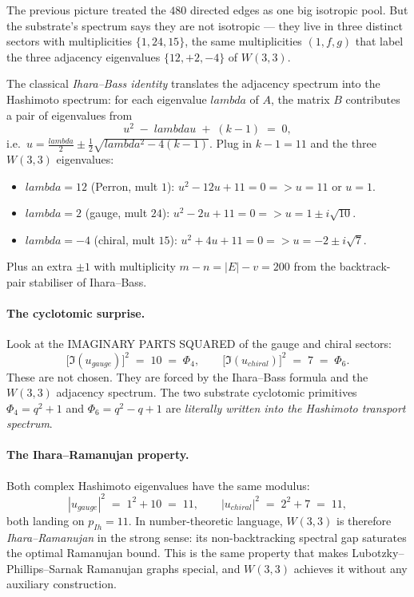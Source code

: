 \documentclass[11pt]{article}
\def\mathrm#1{#1}%
\def\text#1{#1}%
\def\lambda{lambda}%
\def\Phi#1{Phi#1}%
\def\Rightarrow{ => }%
\begin{document}
The previous picture treated the $480$ directed edges as one big
isotropic pool.  But the substrate's spectrum says they are not
isotropic --- they live in three distinct sectors with multiplicities
$\{1, 24, 15\}$, the same multiplicities $(1, f, g)$ that label the
three adjacency eigenvalues $\{12, +2, -4\}$ of $W(3,3)$.

The classical \emph{Ihara--Bass identity} translates the adjacency
spectrum into the Hashimoto spectrum: for each eigenvalue $\lambda$
of $A$, the matrix $B$ contributes a pair of eigenvalues from
\[
u^2 \;-\; \lambda u \;+\; (k-1) \;=\; 0,
\]
i.e.\ $u = \tfrac{\lambda}{2} \pm \tfrac{1}{2}\sqrt{\lambda^2 - 4(k-1)}$.
Plug in $k-1 = 11$ and the three $W(3,3)$ eigenvalues:

\begin{itemize}[leftmargin=2em]
\item $\lambda = 12$ (Perron, mult $1$): $u^2 - 12u + 11 = 0 \Rightarrow u = 11$ or $u = 1$.
\item $\lambda = 2$ (gauge, mult $24$): $u^2 - 2u + 11 = 0 \Rightarrow u = 1 \pm i\sqrt{10}$.
\item $\lambda = -4$ (chiral, mult $15$): $u^2 + 4u + 11 = 0 \Rightarrow u = -2 \pm i\sqrt{7}$.
\end{itemize}

Plus an extra $\pm 1$ with multiplicity $m - n = |E| - v = 200$
from the backtrack-pair stabiliser of Ihara--Bass.

\paragraph{The cyclotomic surprise.}
Look at the IMAGINARY PARTS SQUARED of the gauge and chiral sectors:
\[
\bigl[\Im(u_{\text{gauge}})\bigr]^2 \;=\; 10 \;=\; \Phi_4,
\qquad
\bigl[\Im(u_{\text{chiral}})\bigr]^2 \;=\; 7 \;=\; \Phi_6.
\]
These are not chosen.  They are forced by the Ihara--Bass formula and
the $W(3,3)$ adjacency spectrum.  The two substrate cyclotomic
primitives $\Phi_4 = q^2 + 1$ and $\Phi_6 = q^2 - q + 1$ are
\emph{literally written into the Hashimoto transport spectrum}.

\paragraph{The Ihara--Ramanujan property.}
Both complex Hashimoto eigenvalues have the same modulus:
\[
|u_{\text{gauge}}|^2 \;=\; 1^2 + 10 \;=\; 11,
\qquad
|u_{\text{chiral}}|^2 \;=\; 2^2 + 7 \;=\; 11,
\]
both landing on $p_{\mathrm{Ih}} = 11$.  In number-theoretic language,
$W(3,3)$ is therefore \emph{Ihara--Ramanujan} in the strong sense: its
non-backtracking spectral gap saturates the optimal Ramanujan bound.
This is the same property that makes Lubotzky--Phillips--Sarnak
Ramanujan graphs special, and $W(3,3)$ achieves it without any
auxiliary construction.
\end{document}
